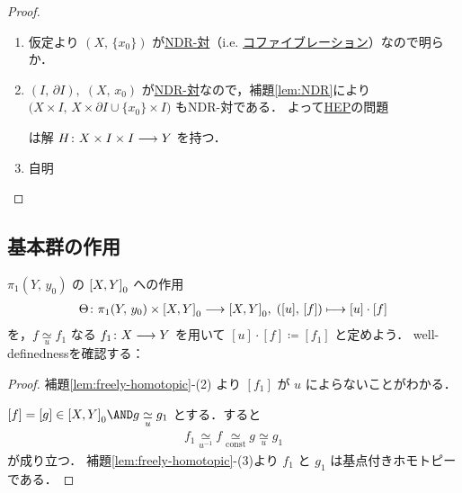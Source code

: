 \documentclass[algtopo_main]{subfiles}
\begin{document}
\begin{proof}
    \begin{enumerate}
        \item 仮定より $(X,\, \{x_0\})$ が\hyperref[def:NDR]{NDR-対}（i.e. \hyperref[thm:cofib-basic-Steenrod]{コファイブレーション}）なので明らか．
        \item $(I,\, \partial I),\; (X,\, x_0)$ が\hyperref[def:NDR]{NDR-対}なので，補題\ref{lem:NDR}により $\bigl(X \times I,\, X \times \partial I \cup \{x_0\} \times I\bigr)$ もNDR-対である．
        よって\hyperref[def:HEP]{HEP}の問題
        \begin{center}
        \end{center}
        は解 $H \colon X \times I \times I \longrightarrow Y$ を持つ．
        \item 自明
    \end{enumerate}
    
\end{proof}

\subsection{基本群の作用}

$\pi_1(Y,\, y_0)$ の $\comm{X}{Y}_0$ への作用
\begin{align}
    \Theta \colon \pi_1(Y,\, y_0) \times \comm{X}{Y}_0 \lto \comm{X}{Y}_0,\; ([u],\, [f]) \lmto [u] \cdot [f]
\end{align}
を，$f \underset{u}{\simeq} f_1$ なる $f_1 \colon X \longrightarrow Y$ を用いて $[u] \cdot [f] \coloneqq [f_1]$ と定めよう．
well-definednessを確認する：
\begin{proof}
    補題\ref{lem:freely-homotopic}-(2) より $[f_1]$ が $u$ によらないことがわかる．

    $[f] = [g] \in \comm{X}{Y}_0 \AND g \underset{u}{\simeq} g_1$ とする．すると
    \begin{align}
        f_1 \underset{u^{-1}}{\simeq} f \underset{\text{const}}{\simeq} g \underset{u}{\simeq} g_1
    \end{align}
    が成り立つ．
    補題\ref{lem:freely-homotopic}-(3)より $f_1$ と $g_1$ は基点付きホモトピーである．
\end{proof}
\end{document}
